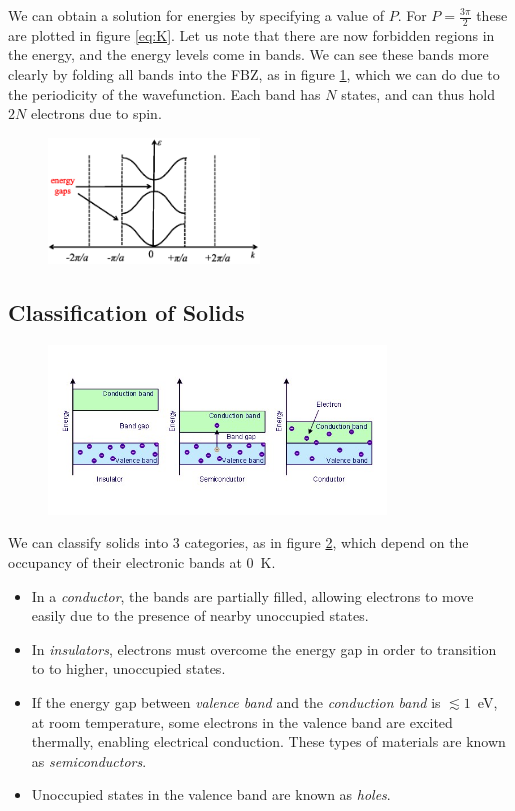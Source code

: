 \documentclass{book}
\begin{document}
We can obtain a solution for energies by specifying a value of $P$. For $P = \frac{3\pi}{2}$ these are plotted in figure \ref{eq:K}. Let us note that there are now forbidden regions in the energy, and the energy levels come in bands. We can see these bands more clearly by folding all bands into the FBZ, as in figure \ref{fig:band gaps}, which we can do due to the periodicity of the wavefunction. Each band has $N$ states, and can thus hold $2N$ electrons due to spin.
\begin{figure}[h]
	\centering
	\includegraphics[width=0.5\textwidth]{band gaps.png}
	\caption{} 
	\label{fig:band gaps}
\end{figure}\noindent
\subsection{Classification of Solids}
\begin{figure}[h]
	\centering
	\includegraphics[width=0.8\textwidth]{bandgap.jpg}
	\caption{}
	\label{fig:semi}
\end{figure}\noindent
We can classify solids into 3 categories, as in figure \ref{fig:semi}, which depend on the occupancy of their electronic bands at $0$~K. 
\begin{itemize}
	\item In a \textit{conductor}, the bands are partially filled, allowing electrons to move easily due to the presence of nearby unoccupied states. 
	\item In \textit{insulators}, electrons must overcome the energy gap in order to transition to to higher, unoccupied states. 
	\item If the energy gap between \textit{valence band} and the \textit{conduction band} is $\lesssim 1$~eV, at room temperature, some electrons in the valence band are excited thermally, enabling electrical conduction. These types of materials are known as \textit{semiconductors}.
	\item Unoccupied states in the valence band are known as \textit{holes}.
\end{itemize}
\appendix
\end{document}
